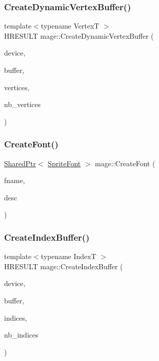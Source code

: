 \hypertarget{namespacemage_aeb9bab1a9d739e3908c90db3832d9053}{}\label{namespacemage_aeb9bab1a9d739e3908c90db3832d9053} 
\subsubsection{\texorpdfstring{Create\+Dynamic\+Vertex\+Buffer()}{CreateDynamicVertexBuffer()}}
{\footnotesize\ttfamily template$<$typename VertexT $>$ \\
H\+R\+E\+S\+U\+LT mage\+::\+Create\+Dynamic\+Vertex\+Buffer (\begin{DoxyParamCaption}\item[{I\+D3\+D11\+Device2 $\ast$}]{device,  }\item[{I\+D3\+D11\+Buffer $\ast$$\ast$}]{buffer,  }\item[{const VertexT $\ast$}]{vertices,  }\item[{size\+\_\+t}]{nb\+\_\+vertices }\end{DoxyParamCaption})}

\hypertarget{namespacemage_ac93dae3a8755fa1e1c9be6c8aa0e07d2}{}\label{namespacemage_ac93dae3a8755fa1e1c9be6c8aa0e07d2} 
\subsubsection{\texorpdfstring{Create\+Font()}{CreateFont()}}
{\footnotesize\ttfamily \hyperlink{namespacemage_a1e01ae66713838a7a67d30e44c67703e}{Shared\+Ptr}$<$ \hyperlink{classmage_1_1_sprite_font}{Sprite\+Font} $>$ mage\+::\+Create\+Font (\begin{DoxyParamCaption}\item[{const wstring \&}]{fname,  }\item[{const \hyperlink{structmage_1_1_sprite_font_descriptor}{Sprite\+Font\+Descriptor} \&}]{desc }\end{DoxyParamCaption})}

\hypertarget{namespacemage_a5a60c12d0fd0ca0e852cf3b0156c9513}{}\label{namespacemage_a5a60c12d0fd0ca0e852cf3b0156c9513} 
\subsubsection{\texorpdfstring{Create\+Index\+Buffer()}{CreateIndexBuffer()}}
{\footnotesize\ttfamily template$<$typename IndexT $>$ \\
H\+R\+E\+S\+U\+LT mage\+::\+Create\+Index\+Buffer (\begin{DoxyParamCaption}\item[{I\+D3\+D11\+Device2 $\ast$}]{device,  }\item[{I\+D3\+D11\+Buffer $\ast$$\ast$}]{buffer,  }\item[{const IndexT $\ast$}]{indices,  }\item[{size\+\_\+t}]{nb\+\_\+indices }\end{DoxyParamCaption})}


